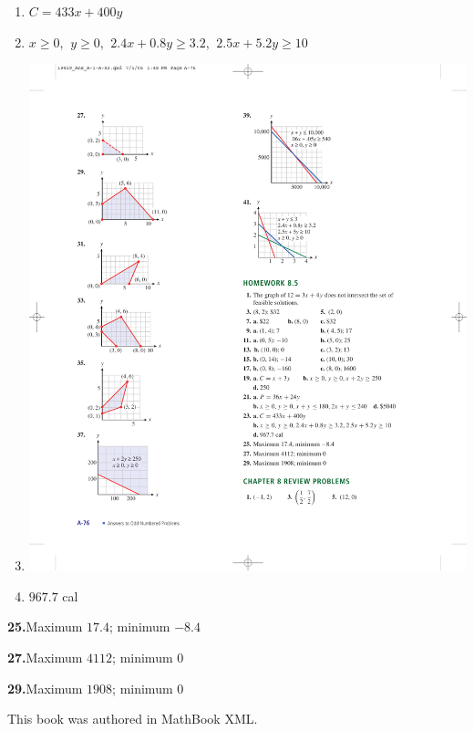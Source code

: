 \documentclass[10pt,]{book}
\theoremstyle{plain}
\theoremstyle{definition}
\theoremstyle{definition}
\theoremstyle{definition}
\numberwithin{equation}{part}
\begin{document}
\begin{multicols}{2}
\begin{enumerate}[label=(\alph*)]
\item\hypertarget{li-81}{}\(C = 433x + 400y\)%
\item\hypertarget{li-82}{}\(x \ge 0\), \(~y \ge 0\), \(~2.4x + 0.8y \ge 3.2\), \(~2.5x + 5.2y \ge 10\)%
\item\hypertarget{li-83}{}\includegraphics[width=0.8\linewidth]{images/fig-ans-8-4-41}
%
\item\hypertarget{li-84}{}\(967.7\) cal%
\end{enumerate}
\end{multicols}
%
\par\smallskip
\noindent\textbf{25.}\quad{}Maximum \(17.4\); minimum \(−8.4\)%
\par\smallskip
\noindent\textbf{27.}\quad{}Maximum \(4112\); minimum \(0\)%
\par\smallskip
\noindent\textbf{29.}\quad{}Maximum \(1908\); minimum \(0\)%
\par\smallskip
%
\backmatter
%
%
\printindex
%
\cleardoublepage
\pagestyle{empty}
\centerline{This book was authored in MathBook XML.%
}
\end{document}
